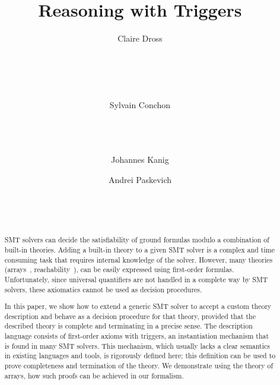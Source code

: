\documentclass[]{easychair}
\title{Reasoning with Triggers}
\author{
Claire Dross\\
\affiliation{LRI, Universit\'e Paris-Sud 11,}\\
\affiliation{CNRS, Orsay F-91405}\\
\affiliation{INRIA Saclay-\^Ile de France,}\\
\affiliation{ProVal, Orsay F-91893}\\
\affiliation{AdaCore, Paris F-75009}
\and
Sylvain Conchon\\
\affiliation{LRI, Universit\'e Paris-Sud 11,}\\
\affiliation{CNRS, Orsay F-91405}\\
\affiliation{INRIA Saclay-\^Ile de France,}\\
\affiliation{ProVal, Orsay F-91893}\and
Johannes Kanig\\
\affiliation{AdaCore, Paris F-75009} \and
Andrei Paskevich\\
\affiliation{LRI, Universit\'e Paris-Sud 11,}\\
\affiliation{CNRS, Orsay F-91405}\\
\affiliation{INRIA Saclay-\^Ile de France,}\\
\affiliation{ProVal, Orsay F-91893}}
\newcommand{\ie}{{\em i.e.},\xspace}
\begin{document}
\maketitle

\begin{abstract}
SMT solvers can decide the satisfiability of ground formulas
modulo a combination of built-in theories. Adding a built-in theory to a given
SMT solver is a complex and time consuming task that requires internal
knowledge of the solver. However, many theories (arrays~\cite{nelson-arrays},
reachability~\cite{lahiri2008back}), can be easily expressed using
first-order formulas. Unfortunately,
since universal quantifiers are not handled in a complete way by SMT solvers,
these axiomatics cannot be used as decision procedures.

In this paper, we show how to extend a generic SMT solver to accept a
custom theory description and behave as a decision procedure for that
theory, provided that the described theory is complete and terminating
in a precise sense. The description language consists of first-order
axioms with triggers, an instantiation mechanism that is found in many
SMT solvers. This mechanism, which usually lacks a clear semantics in
existing languages and tools, is rigorously defined here; this
definition can be used to prove completeness and termination of the
theory. We demonstrate using the theory of arrays, how such proofs can
be achieved in our formalism.
\end{abstract}

%
\end{document}
